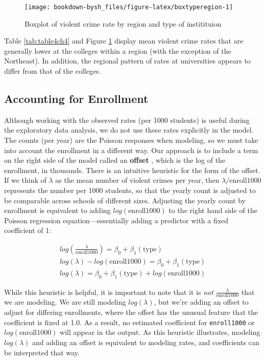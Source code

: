 \documentclass[
]{krantz}
\begin{document}
\begin{figure}

{\centering \texttt{[image: bookdown-bysh\_files/figure-latex/boxtyperegion-1]} 

}

\caption{Boxplot of violent crime rate by region and type of institituion}\label{fig:boxtyperegion}
\end{figure}

Table \ref{tab:table4ch4} and Figure \ref{fig:boxtyperegion} display mean violent crime rates that are generally lower at the colleges within a region (with the exception of the Northeast). In addition, the regional pattern of rates at universities appears to differ from that of the colleges.

\hypertarget{accounting-for-enrollment}{%
\subsection{Accounting for Enrollment}\label{accounting-for-enrollment}}

Although working with the observed rates (per 1000 students) is useful during the exploratory data analysis, we do not use these rates explicitly in the model. The counts (per year) are the Poisson responses when modeling, so we must take into account the enrollment in a different way. Our approach is to include a term on the right side of the model called an \textbf{offset} , which is the log of the enrollment, in thousands. There is an intuitive heuristic for the form of the offset. If we think of \(\lambda\) as the mean number of violent crimes per year, then \(\lambda/\textrm{enroll1000}\) represents the number per 1000 students, so that the yearly count is adjusted to be comparable across schools of different sizes. Adjusting the yearly count by enrollment is equivalent to adding \(log(\textrm{enroll1000})\) to the right hand side of the Poisson regression equation---essentially adding a predictor with a fixed coefficient of 1:

\begin{align*} 
log(\frac{\lambda}{\textrm{enroll1000}} )= \beta_0 + \beta_1(\textrm{type}) \nonumber \\
log(\lambda)-log(\textrm{enroll1000}) = \beta_0 + \beta_1(\textrm{type}) \nonumber \\
log(\lambda) = \beta_0 + \beta_1(\textrm{type}) + log(\textrm{enroll1000})
\end{align*}

While this heuristic is helpful, it is important to note that it is \emph{not} \(\frac{\lambda}{ \textrm{enroll1000}}\) that we are modeling. We are still modeling \(log(\lambda)\), but we're adding an offset to adjust for differing enrollments, where the offset has the unusual feature that the coefficient is fixed at 1.0. As a result, no estimated coefficient for \texttt{enroll1000} or \(log(\textrm{enroll1000})\) will appear in the output. As this heuristic illustrates, modeling \(log(\lambda)\) and adding an offset is equivalent to modeling rates, and coefficients can be interpreted that way.
\end{document}
